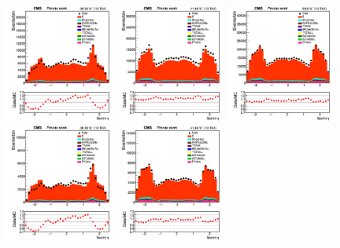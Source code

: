 \documentclass{cernatlasnote}
\begin{document}
  
\begin{figure}[htp]
\centering
\includegraphics[width=0.32\textwidth]{images/emu_channel/2016/16_Range_0pt7_1pt3/SecInt_eta_Selec_Linear.png}
\includegraphics[width=0.32\textwidth]{images/emu_channel/2017/17_Range_0pt7_1pt3/SecInt_eta_Selec_Linear.png}
 \includegraphics[width=0.32\textwidth]{images/emu_channel/2018/18_Range_0pt7_1pt3/SecInt_eta_Selec_Linear.png}\\
 \includegraphics[width=0.32\textwidth]{images/emu_channel/2016/16_Range_0pt7_1pt3/SecInt_eta_TrackerMatched_Linear.png}
\includegraphics[width=0.32\textwidth]{images/emu_channel/2017/17_Range_0pt7_1pt3/SecInt_eta_TrackerMatched_Linear.png}

\end{figure}
\end{document}
